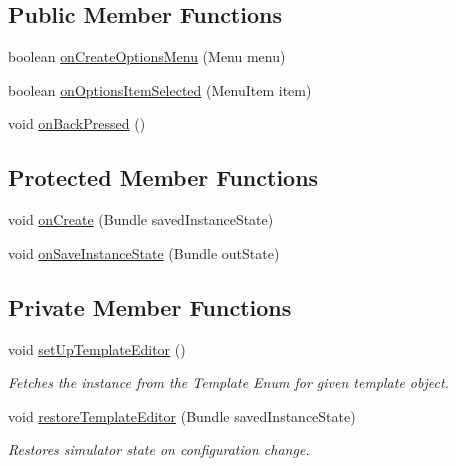 \subsection*{Public Member Functions}
\begin{DoxyCompactItemize}
\item 
boolean \hyperlink{classorg_1_1buildmlearn_1_1toolkit_1_1simulator_1_1Simulator_aa4b646ec6491ad85b3c96e35c6efcd6b}{on\+Create\+Options\+Menu} (Menu menu)
\item 
boolean \hyperlink{classorg_1_1buildmlearn_1_1toolkit_1_1simulator_1_1Simulator_aaa92074738110f36217c7fa33d920fb1}{on\+Options\+Item\+Selected} (Menu\+Item item)
\item 
void \hyperlink{classorg_1_1buildmlearn_1_1toolkit_1_1simulator_1_1Simulator_a0b8dd29153ad0ebbf090cb5ff29c50fa}{on\+Back\+Pressed} ()
\end{DoxyCompactItemize}
\subsection*{Protected Member Functions}
\begin{DoxyCompactItemize}
\item 
void \hyperlink{classorg_1_1buildmlearn_1_1toolkit_1_1simulator_1_1Simulator_aa1564faa9391f86b07b713365af01ee8}{on\+Create} (Bundle saved\+Instance\+State)
\item 
void \hyperlink{classorg_1_1buildmlearn_1_1toolkit_1_1simulator_1_1Simulator_a56b9664eb7326624e8933961d3e0c535}{on\+Save\+Instance\+State} (Bundle out\+State)
\end{DoxyCompactItemize}
\subsection*{Private Member Functions}
\begin{DoxyCompactItemize}
\item 
void \hyperlink{classorg_1_1buildmlearn_1_1toolkit_1_1simulator_1_1Simulator_a7bcd184d22530dd1683487621e6dd5bf}{set\+Up\+Template\+Editor} ()
\begin{DoxyCompactList}\small\item\em Fetches the instance from the Template Enum for given template object. \end{DoxyCompactList}\item 
void \hyperlink{classorg_1_1buildmlearn_1_1toolkit_1_1simulator_1_1Simulator_a5df030ae2efb3c7cd3b2597867fceaf4}{restore\+Template\+Editor} (Bundle saved\+Instance\+State)
\begin{DoxyCompactList}\small\item\em Restores simulator state on configuration change. \end{DoxyCompactList}\end{DoxyCompactItemize}
